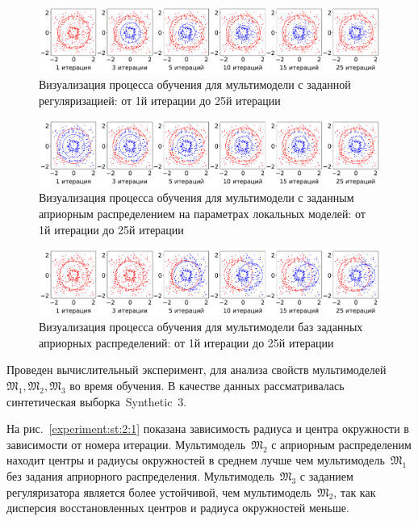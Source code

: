 \documentclass[12pt, twoside]{article}
\numberwithin{equation}{section}
\begin{document}
\begin{figure}[h!t]\center
\includegraphics[width=1\textwidth]{result/experiment_synt_regular_progress}
\caption{Визуализация процесса обучения для мультимодели с заданной регуляризацией: от 1й итерации до  25й итерации}
\label{experiment:st:2:3}
\end{figure}

\begin{figure}[h!t]\center
\includegraphics[width=1\textwidth]{result/experiment_synt_prior_progress}
\caption{Визуализация процесса обучения для мультимодели с заданным априорным распределением на параметрах локальных моделей: от 1й итерации до 25й итерации}
\label{experiment:st:2:4}
\end{figure}

\begin{figure}[h!t]\center
\includegraphics[width=1\textwidth]{result/experiment_synt_not_prior_progress}
\caption{Визуализация процесса обучения для мультимодели баз заданных априорных распределений: от 1й итерации до 25й итерации}
\label{experiment:st:2:5}
\end{figure}
Проведен вычислительный эксперимент, для анализа свойств мультимоделей~$\mathfrak{M}_1, \mathfrak{M}_2, \mathfrak{M}_3$ во время обучения. В качестве данных рассматривалась синтетическая выборка~Synthetic~3.

На рис.~\ref{experiment:st:2:1} показана зависимость радиуса и центра окружности в зависимости от номера итерации. Мультимодель~$\mathfrak{M}_2$ с априорным распределеним находит центры и радиусы окружностей в среднем лучше чем мультимодель~$\mathfrak{M}_1$ без задания априорного распределения. Мультимодель~$\mathfrak{M}_3$ с заданием регуляризатора является более устойчивой, чем мультимодель~$\mathfrak{M}_2$, так как дисперсия восстановленных центров и радиуса окружностей меньше.
\end{document}
